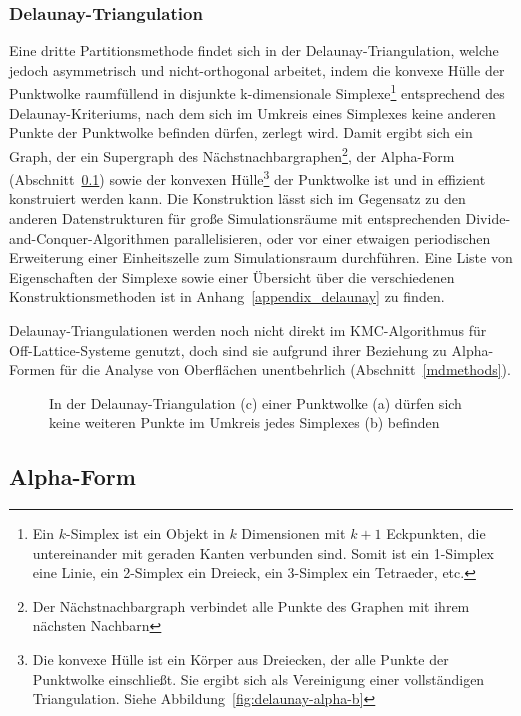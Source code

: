 \subsubsection{Delaunay-Triangulation}
\label{datadelaunay}

Eine dritte Partitionsmethode findet sich in der Delaunay-Triangulation\cite{su_comparison_1995}, welche jedoch asymmetrisch und nicht-orthogonal arbeitet, indem die konvexe Hülle der Punktwolke raumfüllend in disjunkte k-dimensionale Simplexe\footnote{Ein $k$-Simplex ist ein Objekt in $k$ Dimensionen mit $k+1$ Eckpunkten, die untereinander mit geraden Kanten verbunden sind. Somit ist ein 1-Simplex eine Linie, ein 2-Simplex ein Dreieck, ein 3-Simplex ein Tetraeder, etc.}
entsprechend des Delaunay-Kriteriums, nach dem sich im Umkreis eines Simplexes keine anderen Punkte der Punktwolke befinden dürfen, zerlegt wird.
Damit ergibt sich ein Graph, der ein Supergraph des Nächstnachbargraphen\footnote{Der Nächstnachbargraph verbindet alle Punkte des Graphen mit ihrem nächsten Nachbarn}, der Alpha-Form (Abschnitt~\ref{dataalphaform}) sowie der konvexen Hülle\footnote{Die konvexe Hülle ist ein Körper aus Dreiecken, der alle Punkte der Punktwolke einschließt. Sie ergibt sich als Vereinigung einer vollständigen Triangulation. Siehe Abbildung~\ref{fig:delaunay-alpha-b}} der Punktwolke ist und in  effizient konstruiert werden kann.
Die Konstruktion lässt sich im Gegensatz zu den anderen Datenstrukturen für große Simulationsräume mit entsprechenden Divide-and-Conquer-Algorithmen parallelisieren, oder vor einer etwaigen periodischen Erweiterung einer Einheitszelle zum Simulationsraum durchführen.
Eine Liste von Eigenschaften der Simplexe sowie einer Übersicht über die verschiedenen Konstruktionsmethoden ist in Anhang~\ref{appendix_delaunay} zu finden.

Delaunay-Triangulationen werden noch nicht direkt im KMC-Algorithmus für Off-Lattice-Systeme genutzt, doch sind sie aufgrund ihrer Beziehung zu Alpha-Formen für die Analyse von Oberflächen unentbehrlich (Abschnitt~\ref{mdmethods}).

\begin{figure}[!h]
  \centering
  \def\svgwidth{\textwidth}
  
  \caption[Schema des Delaunay-Kriteriums]{
    In der Delaunay-Triangulation (c) einer Punktwolke (a) dürfen sich keine weiteren Punkte im Umkreis jedes Simplexes (b) befinden
  }
  \label{fig:delaunay}
\end{figure}

\subsection{Alpha-Form}
\label{dataalphaform}

